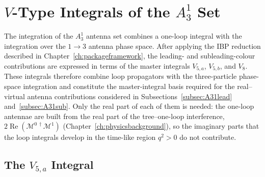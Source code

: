 \section{$V$-Type Integrals of the $A_3^1$ Set}\label{sec:MIA31}

The integration of the $A_3^1$ antenna set combines a one-loop integral with the integration over the $1\to3$ antenna phase space. After applying the IBP reduction
described in Chapter~\ref{ch:packageframework}, the leading- and subleading-colour
contributions are expressed in terms of the master integrals $V_{5,a}$, $V_{5,b}$, and
$V_8$. These integrals therefore combine loop propagators with the three-particle
phase-space integration and constitute the master-integral basis required for the
real--virtual antenna contributions considered in Subsections~\ref{subsec:A31lead}
and~\ref{subsec:A31sub}. Only the real part of each of them is needed: the one-loop
antennae are built from the real part of the tree--one-loop interference,
$2\operatorname{Re}\!\left(\mathcal M^{0\,\dagger}\mathcal M^1\right)$
(Chapter~\ref{ch:physicsbackground}), so the imaginary parts that the loop integrals
develop in the time-like region $q^2>0$ do not contribute.

\subsection{The $V_{5,a}$ Integral}

